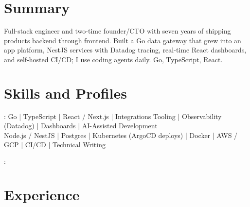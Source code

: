 \documentclass[print]{jack-resume}
\begin{document}
\pagecolor{darkmodeBackground}


\begin{minipage}[t][1cm][t]{.03\textwidth}
    \hfill
\end{minipage}

\section{Summary}
Full-stack engineer and two-time founder/CTO with seven years of shipping products backend through frontend. Built a Go data gateway that grew into an app platform, NestJS services with Datadog tracing, real-time React dashboards, and self-hosted CI/CD; I use coding agents daily. Go, TypeScript, React.
\sectionsep

\section{Skills and Profiles}
:
Go \hfill | \hfill
TypeScript \hfill | \hfill
React / Next.js \hfill | \hfill
Integrations Tooling \hfill | \hfill
Observability (Datadog) \hfill | \hfill
Dashboards \hfill | \hfill
AI-Assisted Development \\
\hspace{1.0cm} Node.js / NestJS \hfill | \hfill
Postgres \hfill | \hfill
Kubernetes (ArgoCD deploys) \hfill | \hfill
Docker \hfill | \hfill
AWS / GCP \hfill | \hfill
CI/CD \hfill | \hfill
Technical Writing \\

\raggedright{
    :
      \href{https://www.linkedin.com/in/jack-sturtevant/}{ \ExternalLink} |
     \href{https://github.com/jacksturt}{ \ExternalLink}}

\section{Experience}
\end{document}
